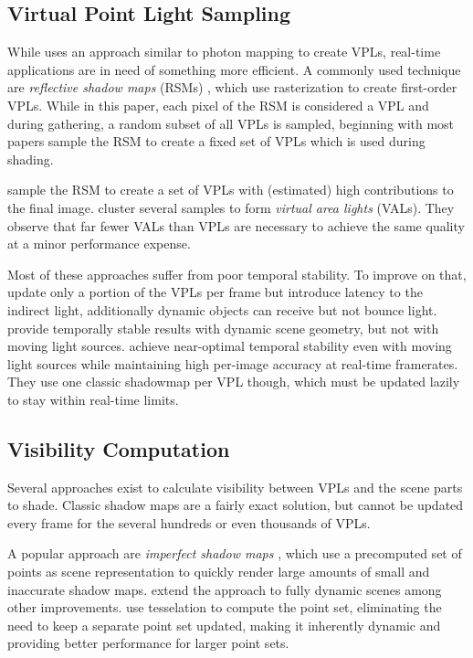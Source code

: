 \subsection{Virtual Point Light Sampling}

While \citet{Keller:1997:InstantRadiosity} uses an approach similar to photon mapping to create VPLs, real-time applications are in need of something more efficient. A commonly used technique are \emph{reflective shadow maps} (RSMs) \citep{Dachsbacher:2005:RSM}, which use rasterization to create first-order VPLs. While in this paper, each pixel of the RSM is considered a VPL and during gathering, a random subset of all VPLs is sampled, beginning with \citet{dachsbacher2006splatting} most papers sample the RSM to create a fixed set of VPLs which is used during shading.

\citet{georgiev2010simple, ritschel2011ismsViewAdaptive} sample the RSM to create a set of VPLs with (estimated) high contributions to the final image. \citet{dong2009real, prutkin2012reflective} cluster several samples to form \emph{virtual area lights} (VALs). They observe that far fewer VALs than VPLs are necessary to achieve the same quality at a minor performance expense.

Most of these approaches suffer from poor temporal stability. To improve on that, \citet{laine2007incremental} update only a portion of the VPLs per frame but introduce latency to the indirect light, additionally dynamic objects can receive but not bounce light. \citet{barak2013temporally} provide temporally stable results with dynamic scene geometry, but not with moving light sources. \citet{hedman2016sequential} achieve near-optimal temporal stability even with moving light sources while maintaining high per-image accuracy at real-time framerates. They use one classic shadowmap per VPL though, which must be updated lazily to stay within real-time limits.


\subsection{Visibility Computation}

Several approaches exist to calculate visibility between VPLs and the scene parts to shade. Classic shadow maps are a fairly exact solution, but cannot be updated every frame for the several hundreds or even thousands of VPLs.

A popular approach are \emph{imperfect shadow maps} \citep[ISMs,][]{ritschel2008ism}, which use a precomputed set of points as scene representation to quickly render large amounts of small and inaccurate shadow maps. \citet{ritschel2011ismsViewAdaptive} extend the approach to fully dynamic scenes among other improvements. \citet{barak2013temporally} use tesselation to compute the point set, eliminating the need to keep a separate point set updated, making it inherently dynamic and providing better performance for larger point sets. 

